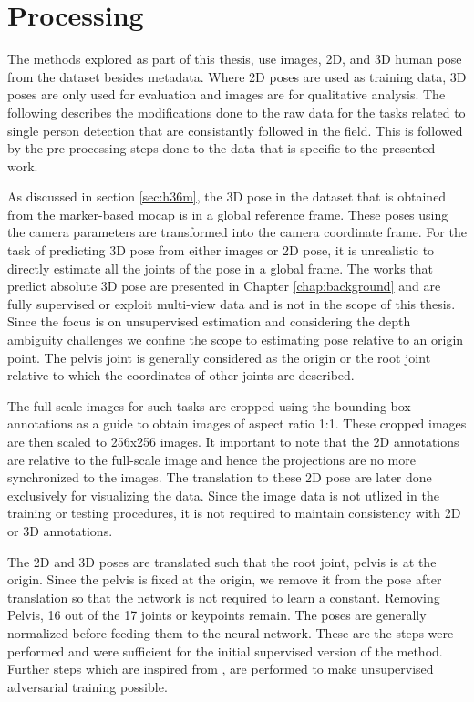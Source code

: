 \section{Processing}
\label{processing}
The methods explored as part of this thesis, use images, 2D, and 3D human pose from the dataset besides metadata. Where 2D poses are used as training data, 3D poses are only used for evaluation and images are for qualitative analysis. The following describes the modifications done to the raw data for the tasks related to single person detection that are consistantly followed in the field. This is followed by the pre-processing steps done to the data that is specific to the presented work.

As discussed in section \ref{sec:h36m}, the 3D pose in the dataset that is obtained from the marker-based \ac{mocap} is in a global reference frame. These poses using the camera parameters are transformed into the camera coordinate frame. For the task of predicting 3D pose from either images or 2D pose, it is unrealistic to directly estimate all the joints of the pose in a global frame. The works that predict absolute 3D pose are presented in Chapter \ref{chap:background} and are fully supervised or exploit multi-view data and is not in the scope of this thesis. Since the focus is on unsupervised estimation and considering the depth ambiguity challenges we confine the scope to estimating pose relative to an origin point. The pelvis joint is generally considered as the origin or the root joint relative to which the coordinates of other joints are described. 

The full-scale images for such tasks are cropped using the bounding box annotations as a guide to obtain images of aspect ratio 1:1. These cropped images are then scaled to 256x256 images. It important to note that the 2D annotations are relative to the full-scale image and hence the projections are no more synchronized to the images. The translation to these 2D pose are later done exclusively for visualizing the data. Since the image data is not utlized in the training or testing procedures, it is not required to maintain consistency with 2D or 3D annotations. 

The 2D and 3D poses are translated such that the root joint, pelvis is at the origin. Since the pelvis is fixed at the origin, we remove it from the pose after translation so that the network is not required to learn a constant. Removing Pelvis, 16 out of the 17 joints or keypoints remain. The poses are generally normalized before feeding them to the neural network. These are the steps were performed and were sufficient for the initial supervised version of the method. Further steps which are inspired from \cite{amazon1}, are performed to make unsupervised adversarial training possible. 

